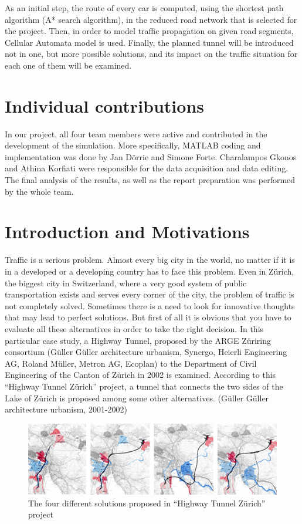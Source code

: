 \documentclass[11pt]{article}
\begin{document}
As an initial step, the route of every car is computed, using the shortest path algorithm (A* search algorithm), in the reduced road network that is selected for the project. Then, in order to model traffic propagation on given road segments, Cellular Automata model is used. Finally, the planned tunnel will be introduced not in one, but more possible solutions, and its impact on the traffic situation for each one of them will be examined.


\section{Individual contributions}
In our project, all four team members were active and contributed in the development of the simulation. More specifically, MATLAB coding and implementation was done by Jan D\"orrie and Simone Forte. Charalampos Gkonos and Athina Korfiati were responsible for the data acquisition and data editing. The final analysis of the results, as well as the report preparation was performed by the whole team.

\section{Introduction and Motivations}
Traffic is a serious problem. Almost every big city in the world, no matter if it is in a developed or a developing country has to face this problem. Even in Z\"urich, the biggest city in Switzerland, where a very good system of public transportation exists and serves every corner of the city, the problem of traffic is not completely solved. Sometimes there is a need to look for innovative thoughts that may lead to perfect solutions. But first of all it is obvious that you have to evaluate all these alternatives in order to take the right decision. In this particular case study, a Highway Tunnel, proposed by the ARGE Z\"uriring consortium (G\"uller G\"uller architecture urbanism, Synergo, Heierli Engineering AG, Roland M\"uller, Metron AG, Ecoplan) to the Department of Civil Engineering of the Canton of Z\"urich in 2002 is examined. According to this “Highway Tunnel Z\"urich” project, a tunnel that connects the two sides of the Lake of Z\"urich is proposed among some other alternatives. (G\"uller G\"uller architecture urbanism, 2001-2002)

\begin{figure}[ht]
	\begin{center}
		\includegraphics[width=\linewidth]{../img/GG03_1a.jpg}
	\end{center}
	\caption{The four different solutions proposed in ``Highway Tunnel Z\"{u}rich'' project \cite{GGau}}
	\label{fig:tunnel}
\end{figure}
\end{document}
